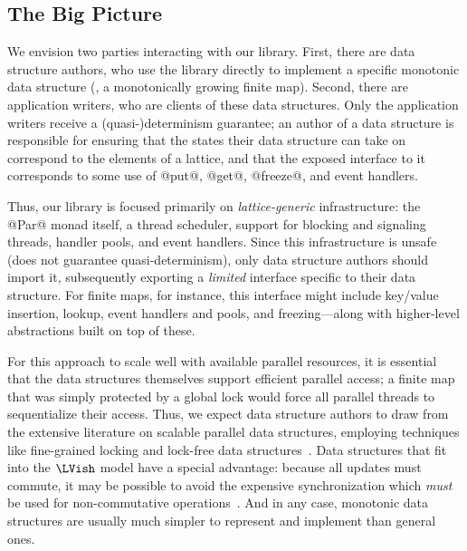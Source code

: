 
\subsection{The Big Picture}

We envision two parties interacting with our library.  First, there are data
structure authors, who use the library directly to implement a specific
monotonic data structure (\eg, a monotonically growing finite map).  Second,
there are application writers, who are clients of these data structures.  Only
the application writers receive a \mbox{(quasi-)determinism} guarantee; an author of a
data structure is responsible for ensuring that the states their data structure can take on
correspond to the elements of a lattice, and that the exposed interface to it corresponds to
some use of @put@, @get@, @freeze@, and event handlers.

Thus, our library is focused primarily on \emph{lattice-generic} infrastructure:
the @Par@ monad itself, a thread scheduler, support for blocking and signaling
threads, handler pools, and event handlers.  Since this infrastructure is unsafe
(does not guarantee quasi-determinism), only data structure authors should
import it, subsequently exporting a \emph{limited} interface specific to their
data structure.  For finite maps, for instance, this interface might include key/value
insertion, lookup, event handlers and pools, and freezing---along with
higher-level abstractions built on top of these.

For this approach to scale well with available parallel resources, it is
essential that the data structures themselves support efficient parallel access;
a finite map that was simply protected by a global lock would force all parallel
threads to sequentialize their access.  Thus, we expect data structure authors
to draw from the extensive literature on scalable parallel data structures,
employing techniques like fine-grained locking and lock-free data
structures~\cite{art}.  Data structures that fit into the $\LVish$ model have a
special advantage: because all updates must commute, it may be possible to avoid
the expensive synchronization which \emph{must} be used for non-commutative
operations~\cite{lawsOfOrder}.  And in any case, monotonic data structures are usually
much simpler to represent and implement than general ones.

